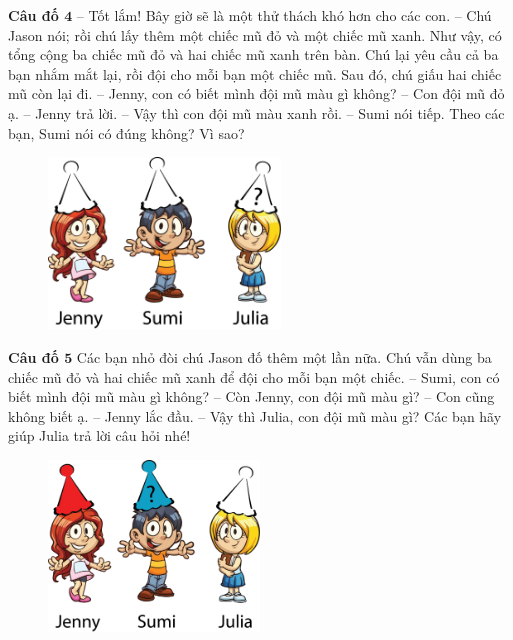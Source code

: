 	
	\textbf{\color{toancuabi}Câu đố $\pmb4$}
	\vskip 0.1cm
	-- Tốt lắm! Bây giờ sẽ là một thử thách khó hơn cho các con. -- Chú Jason nói; rồi chú lấy thêm một chiếc mũ đỏ và một chiếc mũ xanh. Như vậy, có tổng cộng ba chiếc mũ đỏ và hai chiếc mũ xanh trên bàn. Chú lại yêu cầu cả ba bạn nhắm mắt lại, rồi đội cho mỗi bạn một chiếc mũ. Sau đó, chú giấu hai chiếc mũ còn lại đi.
	\vskip 0.1cm
	-- Jenny, con có biết mình đội mũ màu gì không?
	\vskip 0.1cm
	-- Con đội mũ đỏ ạ. -- Jenny trả lời.
	\vskip 0.1cm
	-- Vậy thì con đội mũ màu xanh rồi. -- Sumi  nói tiếp.
	\vskip 0.1cm
	Theo các bạn, Sumi nói có đúng không? Vì sao?
	\begin{figure}[H]
		\centering
		\vspace*{-5pt}
		\captionsetup{labelformat= empty, justification=centering}
		\includegraphics[width=0.55\textwidth]{h5}
		\vspace*{-10pt}
	\end{figure}
	
	\textbf{\color{toancuabi}Câu đố $\pmb5$}
	\vskip 0.1cm
	Các bạn nhỏ đòi chú Jason đố thêm một lần nữa. Chú vẫn dùng ba chiếc mũ đỏ và hai chiếc mũ xanh để đội cho mỗi bạn một chiếc.
	\vskip 0.1cm
	-- Sumi, con có biết mình đội mũ màu gì không?
	\vskip 0.1cm
	-- Còn Jenny, con đội mũ màu gì?
	\vskip 0.1cm
	-- Con cũng không biết ạ. -- Jenny lắc đầu.
	\vskip 0.1cm
	-- Vậy thì Julia, con đội mũ màu gì?
	\vskip 0.1cm
	Các bạn hãy giúp Julia trả lời câu hỏi nhé!
	\begin{figure}[H]
		\centering
		\vspace*{-5pt}
		\captionsetup{labelformat= empty, justification=centering}
		\includegraphics[width=0.5\textwidth]{h4}
		\vspace*{-10pt}
	\end{figure}
